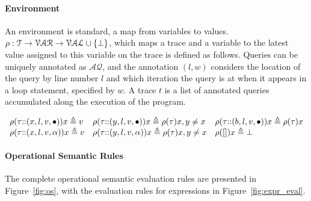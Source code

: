 \paragraph*{Environment}
An environment is standard, a map from variables to values.
$\rho : {\mathcal{T}}  \to \mathcal{VAR} \to \mathcal{VAL} \cup \{\bot\}$, 
which maps a trace and a variable to the latest value assigned to this variable on the trace is defined as follows.
Queries can be uniquely annotated as $\mathcal{AQ}$, and the annotation $(l,w)$ considers the location of the query by line number $l$ and which 
iteration the query is at when it appears in a loop statement, specified by $w$. A trace $t$ is a list of annotated queries accumulated along the execution of the program. 

\[
\begin{array}{lll}
\rho(\mathtt{\tau}  {\small ::} (x, l, v, \bullet)) x \triangleq v
&
\rho(\mathtt{\tau} {\small ::} (y, l, v, \bullet)) x \triangleq \rho(\mathtt{\tau}) x, y \neq x
&
\rho(\mathtt{\tau} {\small ::} (b, l, v, \bullet)) x \triangleq \rho(\mathtt{\tau}) x
\\
\rho(\mathtt{\tau} {\small ::} (x, l, v, \alpha)) x \triangleq v
&
\rho(\mathtt{\tau} {\small ::} (y, l, v, \alpha)) x \triangleq \rho(\mathtt{\tau}) x, y \neq x
&
\rho({[]} ) x \triangleq \bot
\end{array}
\]

 \paragraph*{Operational Semantic Rules}
 The complete operational semantic evaluation rules are presented in Figure~\ref{fig:os},
 with the evaluation rules for expressions in Figure~\ref{fig:expr_eval}.

